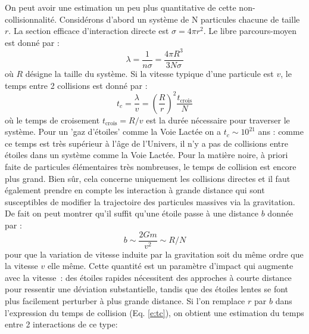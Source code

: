 On peut avoir une estimation un peu plus quantitative de cette non-collisionnalité. Considérons d'abord un système de N particules chacune de taille $r$. La section efficace d'interaction directe est $\sigma=4\pi r^2$. Le libre parcours-moyen est donné par :
\begin{equation}
\lambda=\frac{1}{n\sigma}=\frac{4\pi R^3}{3 N \sigma}
\end{equation}
où $R$ désigne la taille du système. Si la vitesse typique d'une particule est $v$, le temps entre 2 collisions est donné par :
\begin{equation}
t_c=\frac{\lambda}{v}=\left(\frac{R}{r}\right)^2 \frac{t_\mathrm{crois}}{N}
\label{e:tc}
\end{equation}
où le temps de croisement $t_\mathrm{crois}=R/v$ est la durée nécessaire pour traverser le système. Pour un 'gaz d'étoiles' comme la Voie Lactée on a $t_c\sim 10^{21}$ ans : comme ce temps est très supérieur à l'âge de l'Univers, il n'y a pas de collisions entre étoiles dans un système comme la Voie Lactée. Pour la matière noire, à priori faite de particules élémentaires très nombreuses, le temps de collision est encore plus grand.
Bien sûr, cela concerne uniquement les collisions directes et il faut également prendre en compte les interaction à grande distance qui sont susceptibles de modifier la trajectoire des particules massives via la gravitation. De fait on peut montrer qu'il suffit qu'une étoile passe à une distance $b$ donnée par :
\begin{equation}
b\sim\frac{2Gm}{v^2}\sim R/N
\end{equation}
pour que la variation de vitesse induite par la gravitation soit du même ordre que la vitesse $v$ elle même. Cette quantité est un paramètre d'impact qui augmente avec la vitesse~: des étoiles rapides nécessitent des approches à courte distance pour ressentir une déviation substantielle, tandis que des étoiles lentes se font plus facilement perturber à plus grande distance. Si l'on remplace $r$ par $b$ dans l'expression du temps de collision (Eq. \ref{e:tc}), on obtient une estimation du temps entre 2 interactions de ce type:
